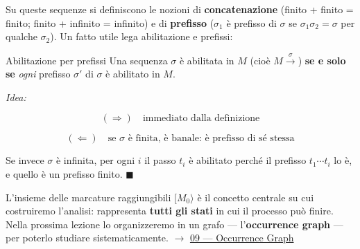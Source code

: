 Su queste sequenze si definiscono le nozioni di \textbf{concatenazione} (finito + finito = finito; finito + infinito = infinito) e di \textbf{prefisso} ($\sigma_1$ è prefisso di $\sigma$ se $\sigma_1\sigma_2 = \sigma$ per qualche $\sigma_2$). Un fatto utile lega abilitazione e prefissi:

\begin{boxtheorem}{Abilitazione per prefissi}
Una sequenza $\sigma$ è abilitata in $M$ (cioè $M \xrightarrow{\sigma}$) \textbf{se e solo se} \emph{ogni} prefisso $\sigma'$ di $\sigma$ è abilitato in $M$.

\emph{Idea:}

\[
(\Rightarrow) \quad \text{immediato dalla definizione}
\]

\[
(\Leftarrow) \quad \text{se } \sigma \text{ è finita, è banale: è prefisso di sé stessa}
\]

Se invece $\sigma$ è infinita, per ogni $i$ il passo $t_i$ è abilitato perché il prefisso $t_1\cdots t_i$ lo è, e quello è un prefisso finito. $\blacksquare$
\end{boxtheorem}

L'insieme delle marcature raggiungibili $[M_0\rangle$ è il concetto centrale su cui costruiremo l'analisi: rappresenta \textbf{tutti gli stati} in cui il processo può finire. Nella prossima lezione lo organizzeremo in un grafo — l'\textbf{occurrence graph} — per poterlo studiare sistematicamente. $\rightarrow$ \hyperref[ch:09]{09 — Occurrence Graph}